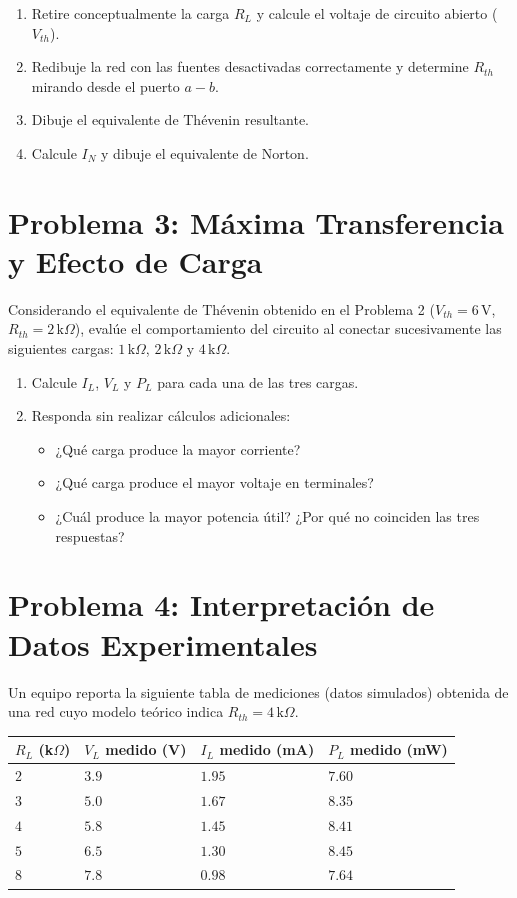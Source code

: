 \documentclass[11pt, a4paper]{article}
\begin{document}
\begin{enumerate}
    \item Retire conceptualmente la carga $R_L$ y calcule el voltaje de circuito abierto ($V_{th}$).
    \item Redibuje la red con las fuentes desactivadas correctamente y determine $R_{th}$ mirando desde el puerto $a-b$.
    \item Dibuje el equivalente de Thévenin resultante.
    \item Calcule $I_N$ y dibuje el equivalente de Norton.
\end{enumerate}

\section*{Problema 3: Máxima Transferencia y Efecto de Carga}
Considerando el equivalente de Thévenin obtenido en el Problema 2 ($V_{th} = 6\,\text{V}$, $R_{th} = 2\,\text{k}\Omega$), evalúe el comportamiento del circuito al conectar sucesivamente las siguientes cargas: $1\,\text{k}\Omega$, $2\,\text{k}\Omega$ y $4\,\text{k}\Omega$.
\begin{enumerate}
    \item Calcule $I_L$, $V_L$ y $P_L$ para cada una de las tres cargas.
    \item Responda sin realizar cálculos adicionales:
    \begin{itemize}
        \item ¿Qué carga produce la mayor corriente?
        \item ¿Qué carga produce el mayor voltaje en terminales?
        \item ¿Cuál produce la mayor potencia útil? ¿Por qué no coinciden las tres respuestas?
    \end{itemize}
\end{enumerate}

\section*{Problema 4: Interpretación de Datos Experimentales}
Un equipo reporta la siguiente tabla de mediciones (datos simulados) obtenida de una red cuyo modelo teórico indica $R_{th} = 4\,\text{k}\Omega$.

\vspace{0.2cm}
\noindent
\begin{tabularx}{\textwidth}{*{4}{>{\centering\arraybackslash}X}}
\toprule
\textbf{$R_L$ (k$\Omega$)} & \textbf{$V_L$ medido (V)} & \textbf{$I_L$ medido (mA)} & \textbf{$P_L$ medido (mW)} \\
\midrule
$2$ & $3.9$ & $1.95$ & $7.60$ \\ \addlinespace
$3$ & $5.0$ & $1.67$ & $8.35$ \\ \addlinespace
$4$ & $5.8$ & $1.45$ & $8.41$ \\ \addlinespace
$5$ & $6.5$ & $1.30$ & $8.45$ \\ \addlinespace
$8$ & $7.8$ & $0.98$ & $7.64$ \\
\bottomrule
\end{tabularx}
\vspace{0.2cm}
\end{document}
